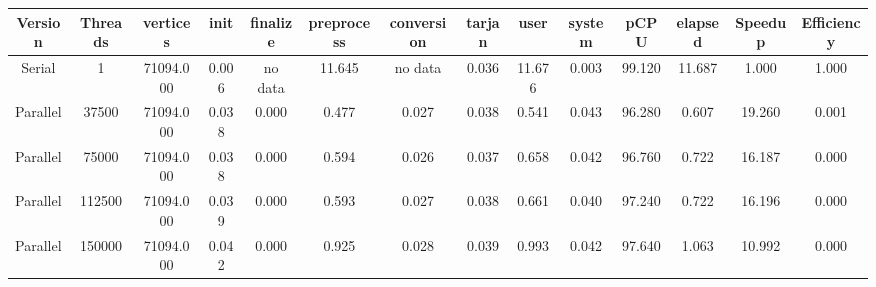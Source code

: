 \begin{tabular}{|c|c|c|c|c|c|c|c|c|c|c|c|c|c|}
\toprule
 Version &  Threads &   vertices &  init & finalize &  preprocess & conversion &  tarjan &   user &  system &   pCPU &  elapsed &  Speedup &  Efficiency \\
\midrule
  Serial &        1 &  71094.000 & 0.006 &  no data &      11.645 &    no data &   0.036 & 11.676 &   0.003 & 99.120 &   11.687 &    1.000 &       1.000 \\
Parallel &    37500 &  71094.000 & 0.038 &    0.000 &       0.477 &      0.027 &   0.038 &  0.541 &   0.043 & 96.280 &    0.607 &   19.260 &       0.001 \\
Parallel &    75000 &  71094.000 & 0.038 &    0.000 &       0.594 &      0.026 &   0.037 &  0.658 &   0.042 & 96.760 &    0.722 &   16.187 &       0.000 \\
Parallel &   112500 &  71094.000 & 0.039 &    0.000 &       0.593 &      0.027 &   0.038 &  0.661 &   0.040 & 97.240 &    0.722 &   16.196 &       0.000 \\
Parallel &   150000 &  71094.000 & 0.042 &    0.000 &       0.925 &      0.028 &   0.039 &  0.993 &   0.042 & 97.640 &    1.063 &   10.992 &       0.000 \\
\bottomrule
\end{tabular}
